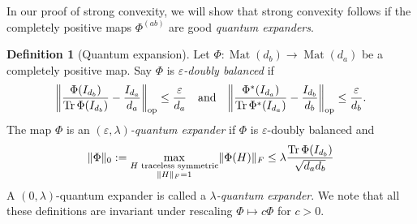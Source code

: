 \documentclass[aos]{imsart}
\theoremstyle{definition}
\newtheorem*{definition}{Definition}
\numberwithin{equation}{section}
\DeclareMathOperator{\op}{op}
\DeclareMathOperator{\Mat}{Mat}
\DeclareMathOperator{\tr}{Tr}
\DeclareMathOperator{\vect}{vec}
\DeclarePairedDelimiter{\norm}{\lVert}{\rVert}
\newcommand{\ot}{\otimes}
\newcommand{\eps}{\varepsilon}
\begin{document}
%
In our proof of strong convexity, we will show that strong convexity follows if the completely positive maps $\Phi^{(ab)}$ are good \emph{quantum expanders}.

\begin{definition}[Quantum expansion]
Let $\Phi\colon\Mat(d_b) \to \Mat(d_a)$ be a completely positive map.
Say $\Phi$ is \emph{$\eps$-doubly balanced} if
\begin{align}\label{eq:doubly balanced}
  \norm*{\frac{\Phi(I_{d_b})}{\tr \Phi(I_{d_b})} - \frac{I_{d_a}}{d_a}}_{\op} \leq \frac\eps{d_a}
\quad\text{and}\quad
  \norm*{\frac{\Phi^*(I_{d_a})}{\tr \Phi^*(I_{d_a})} - \frac{I_{d_b}}{d_b}}_{\op} \leq \frac\eps{d_b}.
\end{align}
The map $\Phi$ is an \emph{$(\eps, \lambda)$-quantum expander} if $\Phi$ is $\eps$-doubly balanced and
\begin{align}\label{eq:expansion}
  \norm{\Phi}_0 := \max_{\substack{H \text{ traceless symmetric} \\ \norm H_F=1}} \norm{\Phi(H)}_F
\leq \lambda \frac{\tr \Phi(I_{d_b})}{\sqrt{d_ad_b}}
\end{align}
A $(0, \lambda)$-quantum expander is called a \emph{$\lambda$-quantum expander}.
We note that all these definitions are invariant under rescaling $\Phi \mapsto c\Phi$ for $c>0$.
\end{definition}
\end{document}
